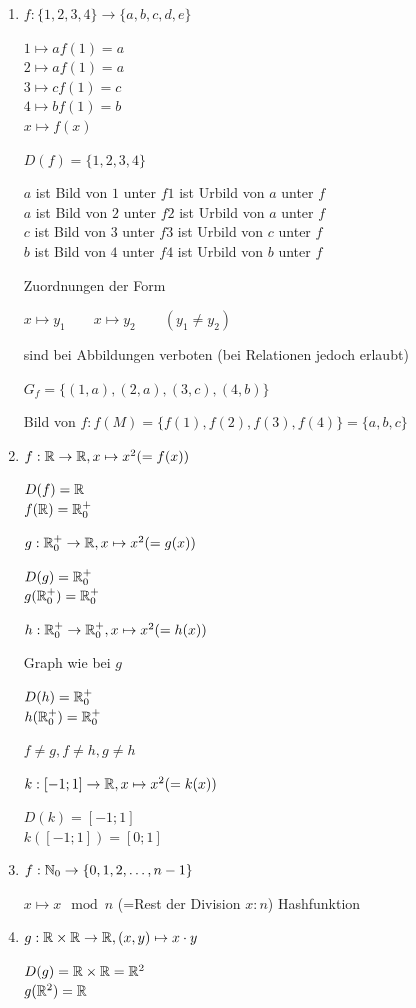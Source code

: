 \begin{enumerate}
	\item $f:\{1,2,3,4\} \to \{a,b,c,d,e\}$
	
	$1\mapsto a$\qquad $f(1)=a$\\
	$2\mapsto a$\qquad $f(1)=a$\\
	$3\mapsto c$\qquad $f(1)=c$\\
	$4\mapsto b$\qquad $f(1)=b$\\
	$x\mapsto f(x)$
			
	$D(f)=\{1,2,3,4\}$
	
	
	$a$ ist Bild von $1$ unter $f$\qquad $1$ ist Urbild von $a$ unter $f$\\
	$a$ ist Bild von $2$ unter $f$\qquad $2$ ist Urbild von $a$ unter $f$\\
	$c$ ist Bild von $3$ unter $f$\qquad $3$ ist Urbild von $c$ unter $f$\\
	$b$ ist Bild von $4$ unter $f$\qquad $4$ ist Urbild von $b$ unter $f$
	
	\Beachte Zuordnungen der Form
	
	$x\mapsto y_1\qquad x\mapsto y_2\qquad (y_1 \ne y_2)$
	
	sind bei Abbildungen verboten (bei Relationen jedoch erlaubt)
	
	$G_f = \{(1,a),(2,a),(3,c),(4,b)\}$
	
	Bild von $f: f(M)=\{f(1),f(2),f(3),f(4)\} = \{a,b,c\}$
	
	\item $f:\mathbb{R}\to\mathbb{R}, x\mapsto x^2 (=f(x))$
	
	
	$D(f) = \mathbb{R}$\\
	$f(\mathbb{R})=\mathbb{R}_0^+$
	
	$g:\mathbb{R}_0^+\to\mathbb{R}, x\mapsto x^2 (=g(x))$
	
	
	$D(g) = \mathbb{R}_0^+$\\
	$g(\mathbb{R}_0^+)=\mathbb{R}_0^+$
	
	
	$h:\mathbb{R}_0^+\to\mathbb{R}_0^+, x\mapsto x^2 (=h(x))$
	
	Graph wie bei $g$
	
	$D(h) = \mathbb{R}_0^+$\\
	$h(\mathbb{R}_0^+)=\mathbb{R}_0^+$
	
	$f\ne g, f\ne h, g\ne h$
	
	$k:[-1;1]\to\mathbb{R}, x\mapsto x^2 (=k(x))$
	
	
	$D(k) = [-1;1]$\\
	$k([-1;1])=[0;1]$
	
	\item $f:\mathbb{N}_0 \to \{0,1,2,\ldots,n-1\}$
	
	$x\mapsto x \mod n$ (=Rest der Division $x:n$) \hfill Hashfunktion
	
	\item $g:\mathbb{R}\times\mathbb{R}\to\mathbb{R}, (x,y)\mapsto x\cdot y$
	
	$D(g)=\mathbb{R}\times\mathbb{R} = \mathbb{R}^2$\\
	$g(\mathbb{R}^2) = \mathbb{R}$
\end{enumerate}

